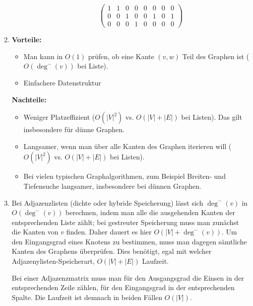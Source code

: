 \documentclass[11pt,a4paper]{article}
\begin{document}
\begin{loesung}
\begin{enumerate}
\begin{description}
\begin{equation*}
\begin{pmatrix}
                    1 & 1 & 0 & 0 & 0 & 0 & 0 & 0 \\
                    0 & 0 & 1 & 0 & 0 & 1 & 0 & 1 \\
                    0 & 0 & 0 & 1 & 0 & 0 & 0 & 0 
                \end{pmatrix}
            \end{equation*}
        \end{description}
        \item
        \textbf{Vorteile:}
        \begin{itemize}
            \item Man kann in $O(1)$ prüfen, ob eine Kante $(v, w)$ Teil des Graphen ist ($O(\operatorname{deg}^-(v))$ bei Liste).
            \item Einfachere Datenstruktur
        \end{itemize}
        \textbf{Nachteile:}
        \begin{itemize}
            \item Weniger Platzeffizient ($O(|V|^2)$ vs. $O(|V| + |E|)$ bei Listen).
            Das gilt insbesondere für dünne Graphen.
            \item Langsamer, wenn man über alle Kanten des Graphen iterieren will ($O(|V|^2)$ vs. $O(|V| + |E|)$ bei Listen).
            \item Bei vielen typischen Graphalgorithmen, zum Beispiel Breiten- und Tiefensuche langsamer, insbesondere bei dünnen Graphen.
        \end{itemize}

        \item
        Bei Adjazenzlisten (dichte oder hybride Speicherung) lässt sich $\operatorname{deg}^-(v)$ in $O(\operatorname{deg}^-(v))$ berechnen, indem man alle die ausgehenden Kanten der entsprechenden Liste zählt;
        bei gestreuter Speicherung muss man zunächst die Kanten von $v$ finden. Daher dauert es hier $O(|V| + \operatorname{deg}^-(v))$.
        Um den Eingangsgrad eines Knotens zu bestimmen, muss man dagegen sämtliche Kanten des Graphens überprüfen.
        Dies benötigt, egal mit welcher Adjazenylisten-Speicherart, $O(|V| + |E|)$ Laufzeit.

        Bei einer Adjazenzmatrix muss man für den Ausgangsgrad die Einsen in der entsprechenden Zeile zählen, für den Eingangsgrad in der entsprechenden Spalte.
        Die Laufzeit ist demnach in beiden Fällen $O(|V|)$.


\end{enumerate}
\end{loesung}
\end{document}
